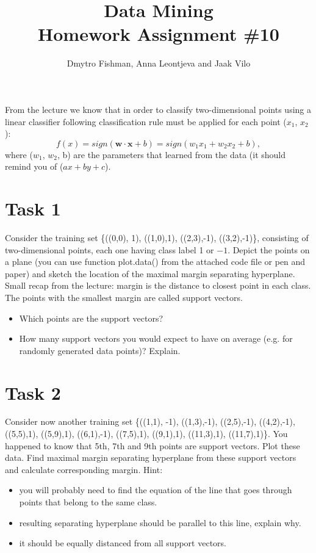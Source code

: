 \documentclass{article}
\title{Data Mining\\Homework Assignment \#10} %
\author{Dmytro Fishman, Anna Leontjeva and Jaak Vilo} %
\begin{document}
\maketitle %
From the lecture we know that in order to classify two-dimensional points using a linear classifier following classification rule must be applied for each point ($x_1$, $x_2$):
$$
f(x) = sign (\textbf{w}\cdot\textbf{x} + b) = sign(w_1x_1 + w_2x_2 + b),
$$ 
where ($w_1$, $w_2$, b) are the parameters that learned from the data (it should remind you of ($ax + by + c$).
\section*{Task 1}
Consider the training set \{((0,0), 1), ((1,0),1), ((2,3),-1), ((3,2),-1)\}, consisting of two-dimensional points, each one having class label 1 or $-1$. Depict the points on a plane (you can use function plot.data() from the attached code file or pen and paper) and sketch the location of the maximal margin separating hyperplane. Small recap from the lecture: margin is the distance to closest point in each class. The points with the smallest margin are called support vectors. 
\begin{itemize}
\item Which points are the support vectors?
\item How many support vectors you would expect to have on average (e.g. for randomly generated data points)? Explain.
\end{itemize}
\section*{Task 2}
Consider now another training set \{((1,1), -1), ((1,3),-1), ((2,5),-1), ((4,2),-1), ((5,5),1), ((5,9),1), ((6,1),-1), ((7,5),1), ((9,1),1), ((11,3),1), ((11,7),1)\}. You happened to know that 5th, 7th and 9th points are support vectors. Plot these data. Find maximal margin separating hyperplane from these support vectors and calculate corresponding margin. 
Hint:
\begin{itemize}
\item you will probably need to find the equation of the line that goes through points that belong to the same class. 
\item resulting separating hyperplane should be parallel to this line, explain why.
\item it should be equally distanced from all support vectors.
\end{itemize}
\end{document}
